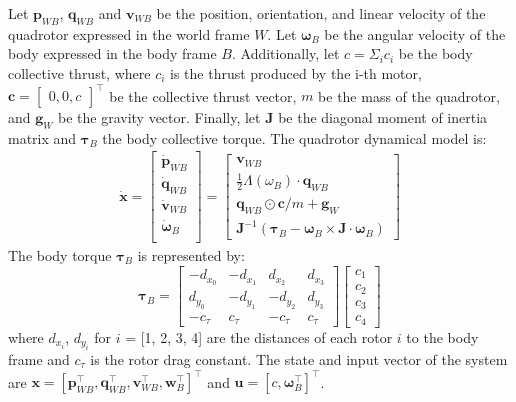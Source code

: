 Let $\bm{p}_{WB}$, $\bm{q}_{WB}$ and $\bm{v}_{WB}$ be the position, orientation, and linear velocity of the quadrotor expressed in the world frame $W$. Let $\bm{\omega}_{B}$ be the angular velocity of the body expressed in the body frame $B$. Additionally, let $c = \Sigma_i c_i$ be the body collective thrust, where $c_i$ is the thrust produced by the i-th motor, $\bm{c} = \begin{bmatrix} 0,  0, c\end{bmatrix}^\intercal$ be the collective thrust vector, $m$ be the mass of the quadrotor, and $\bm{g}_W$ be the gravity vector.
Finally, let $\bm{J}$ be the diagonal moment of inertia matrix and $\bm{\tau}_B$ the body collective torque. The quadrotor dynamical model is:
%
\begin{equation}
	\begin{aligned}
		\dot{\bm{x}} = \begin{bmatrix}
			\dot{\bm{p}}_{WB} \\
			\dot{\bm{q}}_{WB} \\
			\dot{\bm{v}}_{WB} \\
			\dot{\bm{\omega}}_{B} \\
		\end{bmatrix} = \begin{bmatrix}
		\bm{v}_{WB}\\
		\frac{1}{2} \Lambda({\omega}_B) \cdot \bm{q}_{WB}\\
		\bm{q}_{WB} \odot \bm{c}/m + \bm{g}_W\\
		\bm{J}^{-1}(\bm{\tau}_B - \bm{\omega}_B\times \bm{J} \cdot \bm{\omega}_B)
	\end{bmatrix}
	\end{aligned}\label{eq:dynamics}
\end{equation}
%
The body torque $\bm{\tau}_B$ is represented by:
\begin{equation}\label{eq:body_torque}
	\bm{\tau}_B = \begin{bmatrix}
		-d_{x_0}&-d_{x_1}&d_{x_2}&d_{x_3}\\
		d_{y_0}&-d_{y_1}&-d_{y_2}&d_{y_3}\\
		-c_{\tau}&c_{\tau}&-c_{\tau}&c_{\tau}
	\end{bmatrix}\begin{bmatrix}
		c_1\\c_2\\c_3\\c_4
	\end{bmatrix}
\end{equation}
where $d_{x_i}$, $d_{y_i}$ for $i$ = [1, 2, 3, 4] are the distances of each rotor $i$ to the body frame and $c_\tau$ is the rotor drag constant. The state and input vector of the system are $\bm{x} = [\bm{p}_{WB}^\intercal, \bm{q}_{WB}^\intercal, \bm{v}_{WB}^\intercal, \bm{w}_{B}^\intercal]^\intercal$ and  $\bm{u} = [c , \bm{\omega}_B^\intercal]^\intercal$.

